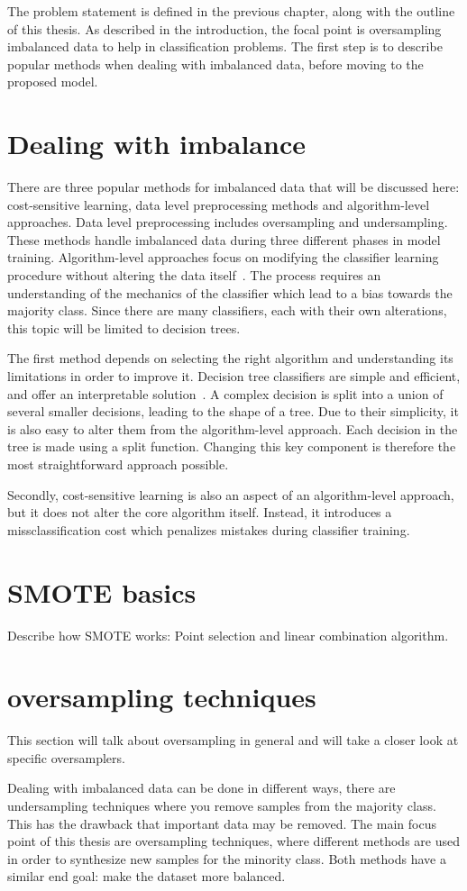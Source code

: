 The problem statement is defined in the previous chapter, along with the outline of this thesis. As described in the introduction, the focal point is oversampling imbalanced data to help in classification problems. The first step is to describe popular methods when dealing with imbalanced data, before moving to the proposed model.

\section{Dealing with imbalance}
There are three popular methods for imbalanced data that will be discussed here: cost-sensitive learning, data level preprocessing methods and algorithm-level approaches. Data level preprocessing includes oversampling and undersampling. These methods handle imbalanced data during three different phases in model training. Algorithm-level approaches focus on modifying the classifier learning procedure without altering the data itself~\cite{Fernandez2018LearningSets}. The process requires an understanding of the mechanics of the classifier which lead to a bias towards the majority class. Since there are many classifiers, each with their own alterations, this topic will be limited to decision trees.

The first method depends on selecting the right algorithm and understanding its limitations in order to improve it. Decision tree classifiers are simple and efficient, and offer an interpretable solution~\cite{Safavian1991AMethodology}. A complex decision is split into a union of several smaller decisions, leading to the shape of a tree. Due to their simplicity, it is also easy to alter them from the algorithm-level approach. Each decision in the tree is made using a split function. Changing this key component is therefore the most straightforward approach possible. 

Secondly, cost-sensitive learning is also an aspect of an algorithm-level approach, but it does not alter the core algorithm itself. Instead, it introduces a missclassification cost which penalizes mistakes during classifier training. 


\section{SMOTE basics}

Describe how SMOTE works: Point selection and linear combination algorithm.

\section{oversampling techniques}
This section will talk about oversampling in general and will take a closer look at specific oversamplers.

Dealing with imbalanced data can be done in different ways, there are undersampling techniques where you remove samples from the majority class. This has the drawback that important data may be removed. The main focus point of this thesis are oversampling techniques, where different methods are used in order to synthesize new samples for the minority class. Both methods have a similar end goal: make the dataset more balanced.